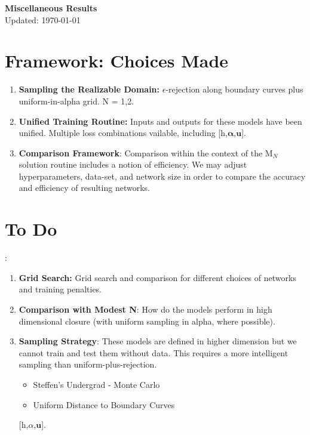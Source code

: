 \documentclass{article}
\renewcommand{\vec}[1]{\mathbf{#1}}
\renewcommand{\vec}[1]{\mathbf{#1}}
\renewcommand{\vec}[1]{\mathbf{#1}}
\theoremstyle{remark}
\numberwithin{equation}{subsection}
\begin{document}
 
	
	
\begin{center}
	\textbf{Miscellaneous Results}
	\\[0.05in]
	Updated: \today 
\end{center}

\tableofcontents


\section{Framework: Choices Made}

\begin{enumerate} 
	\item \textbf{Sampling the Realizable Domain:} $\epsilon$-rejection along boundary curves plus uniform-in-alpha grid. N = 1,2.\\ 

	\item \textbf{Unified Training Routine:} Inputs and outputs for these models have been unified. Multiple loss combinations vailable, including 
	[h,$\boldsymbol{\alpha}$,$\vec{u}$].\\
	
	\item \textbf{Comparison Framework}: Comparison within the context of the M$_N$ solution routine includes a notion of efficiency. We may adjust hyperparameters, data-set, and network size in order to compare the accuracy and efficiency of resulting networks.\\
\end{enumerate}

\section{To Do}:
\begin{enumerate}
\item \textbf{Grid Search:} Grid search and comparison for different choices of networks and training penalties. \\ 

\item \textbf{Comparison with Modest N}: How do the models perform in high dimensional closure (with uniform sampling in alpha, where possible). 

\item \textbf{Sampling Strategy}: These models are defined in higher dimension but we cannot train and test them without data. This requires a more intelligent sampling than uniform-plus-rejection. 
\begin{itemize}
	\item Steffen's Undergrad - Monte Carlo
	\item Uniform Distance to Boundary Curves 
\end{itemize}
[h,$\alpha$,$\vec{u}$].\\
\end{enumerate} 
	
\end{document}
